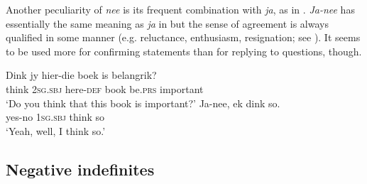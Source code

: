 \documentclass[output=paper,colorlinks,citecolor=brown]{langscibook}
\begin{document}

Another peculiarity of \textit{nee} is its frequent combination with \textit{ja}, as in . \textit{Ja-nee} has essentially the same meaning as \textit{ja} in  but the sense of agreement is always qualified in some manner (e.g. reluctance, enthusiasm, resignation; see \citealt[76--77]{BiberauerEtAl2017}). It seems to be used more for confirming statements than for replying to questions, though.

\ea\label{ex:afr:27}
    \begin{xlist}
    \label{ex:afr:27A}
        \gll Dink jy hier-die boek is belangrik? \\
         think 2\textsc{sg.sbj} here-\textsc{def} book  be.\textsc{prs} important \\
    \glt ‘Do you think that this book is important?’ 
    \label{ex:afr:27B}
        \gll Ja-nee, ek dink so. \\
         yes-no 1\textsc{sg.sbj} think so\\
    \glt ‘Yeah, well, I think so.’
    \end{xlist}
\z 

\subsection{Negative indefinites}
\label{sec:afr:3.2}
\end{document}
